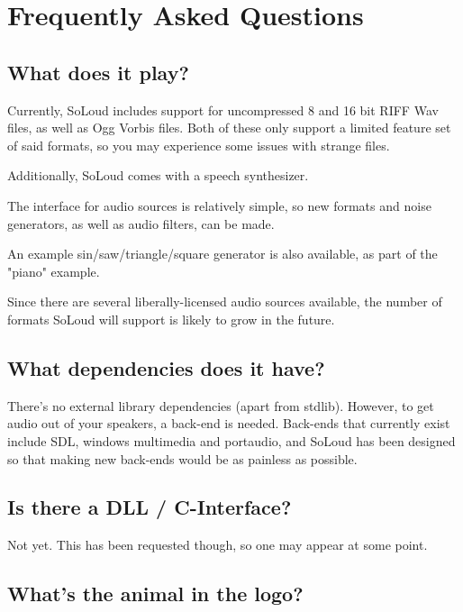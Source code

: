 
\chapter{Frequently Asked Questions}

\section{What does it play?}

Currently, SoLoud includes support for uncompressed 8 and 16 bit RIFF Wav files, as well as Ogg Vorbis files. Both of these only support a limited feature set of said formats, so you may experience some issues with strange files.

Additionally, SoLoud comes with a speech synthesizer.

The interface for audio sources is relatively simple, so new formats and noise generators, as well as audio filters, can be made.

An example sin/saw/triangle/square generator is also available, as part of the "piano" example.

Since there are several liberally-licensed audio sources available, the number of formats SoLoud will support is likely to grow in the future.

\section{What dependencies does it have?}

There's no external library dependencies (apart from stdlib). However, to get audio out of your speakers, a back-end is needed. Back-ends that currently exist include SDL, windows multimedia and portaudio, and SoLoud has been designed so that making new back-ends would be as painless as possible.

\section{Is there a DLL / C-Interface?}

Not yet. This has been requested though, so one may appear at some point.

\section{What's the animal in the logo?}

